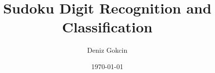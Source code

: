 \newcommand{\mytitle}{Sudoku Digit Recognition and Classification}
\newcommand{\myauthor}{Deniz Gokcin}

\title{\mytitle}
\author{\myauthor}
\date{\today}
